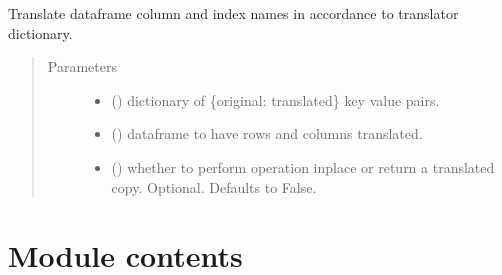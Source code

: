 \documentclass[letterpaper,10pt,english]{sphinxmanual}
\begin{document}

\begin{fulllineitems}
\label{\detokenize{dalio.util:dalio.util.translation_utils.translate_df}}
Translate dataframe column and index names in accordance to translator
dictionary.
\begin{quote}\begin{description}
\item[{Parameters}] \leavevmode\begin{itemize}
\item {} 
 () \textendash{} dictionary of \{original: translated\} key value
pairs.

\item {} 
 () \textendash{} dataframe to have rows and columns translated.

\item {} 
 () \textendash{} whether to perform operation inplace or return a
translated copy. Optional. Defaults to False.

\end{itemize}

\end{description}\end{quote}

\end{fulllineitems}



\section{Module contents}
\label{\detokenize{dalio.util:module-dalio.util}}\label{\detokenize{dalio.util:module-contents}}
\end{document}
